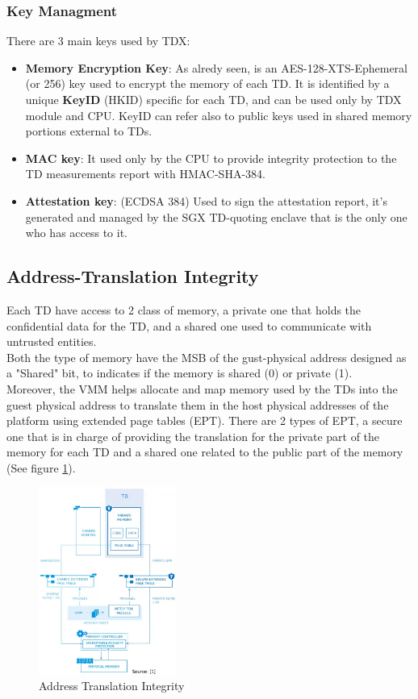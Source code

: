 \subsubsection{Key Managment}
There are 3 main keys used by TDX:
\begin{itemize}
  \item \textbf{Memory Encryption Key}: As alredy seen, is an
    AES-128-XTS-Ephemeral (or 256) key used to encrypt the memory of
    each TD. It is identified by a unique \textbf{KeyID} (HKID)
    specific for each TD, and can be used only by TDX module and CPU.
    KeyID can refer also to public keys used in shared memory portions
    external to TDs.
  \item \textbf{MAC key}: It used only by the CPU to provide integrity
    protection to the TD measurements report with HMAC-SHA-384.
  \item\textbf{ Attestation key}: (ECDSA 384) Used to sign the
    attestation report, it's generated and managed by the SGX
    TD-quoting enclave that is the only one who has access to it.
\end{itemize}

\subsection{Address-Translation Integrity}
Each TD have access to 2 class of memory, a private one that holds the
confidential data for the TD, and a shared one used to communicate
with untrusted entities. \\ 
Both the type of memory have the MSB of the gust-physical address
designed as a "Shared" bit, to indicates if the memory is shared (0)
or private (1). \\
Moreover, the VMM helps allocate and map memory used by the TDs into
the guest physical address to translate them in the host physical
addresses of the platform using extended page tables (EPT). There are
2 types of EPT, a secure one that is in charge of providing the
translation for the private part of the memory for each TD and a
shared one related to the public part of the memory (See figure
\ref{fig:addrs transalation integrity}).

\begin{figure}[H]
    \centering
    \includegraphics[width=0.4\textwidth]{img/addrs transalation integrity.png}
    \caption{Address Translation Integrity}
    \label{fig:addrs transalation integrity}
\end{figure}

